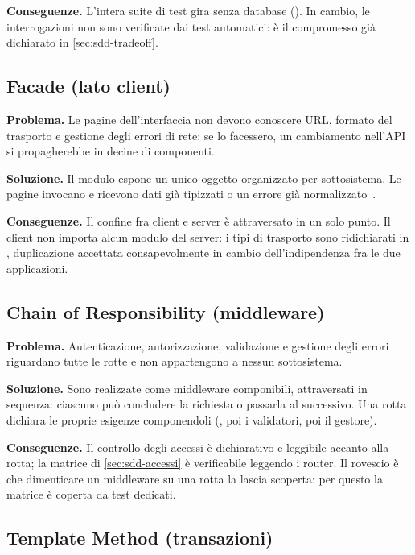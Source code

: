 \textbf{Conseguenze.} L'intera suite di test gira senza database
(). In cambio, le interrogazioni non sono verificate dai test
automatici: è il compromesso già dichiarato in \cref{sec:sdd-tradeoff}.

\subsection{Facade (lato client)}

\textbf{Problema.} Le pagine dell'interfaccia non devono conoscere URL,
formato del trasporto e gestione degli errori di rete: se lo facessero, un
cambiamento nell'API si propagherebbe in decine di componenti.

\textbf{Soluzione.} Il modulo  espone un unico oggetto
organizzato per sottosistema. Le pagine invocano
 e ricevono dati già tipizzati o un errore
già normalizzato~\cite{gamma1994}.

\textbf{Conseguenze.} Il confine fra client e server è attraversato in un
solo punto. Il client non importa alcun modulo del server: i tipi di
trasporto sono ridichiarati in , duplicazione accettata
consapevolmente in cambio dell'indipendenza fra le due applicazioni.

\subsection{Chain of Responsibility (middleware)}

\textbf{Problema.} Autenticazione, autorizzazione, validazione e gestione
degli errori riguardano tutte le rotte e non appartengono a nessun
sottosistema.

\textbf{Soluzione.} Sono realizzate come middleware componibili, attraversati
in sequenza: ciascuno può concludere la richiesta o passarla al successivo.
Una rotta dichiara le proprie esigenze componendoli
(, poi i validatori, poi il gestore).

\textbf{Conseguenze.} Il controllo degli accessi è dichiarativo e leggibile
accanto alla rotta; la matrice di \cref{sec:sdd-accessi} è verificabile
leggendo i router. Il rovescio è che dimenticare un middleware su una rotta
la lascia scoperta: per questo la matrice è coperta da test dedicati.

\subsection{Template Method (transazioni)}


